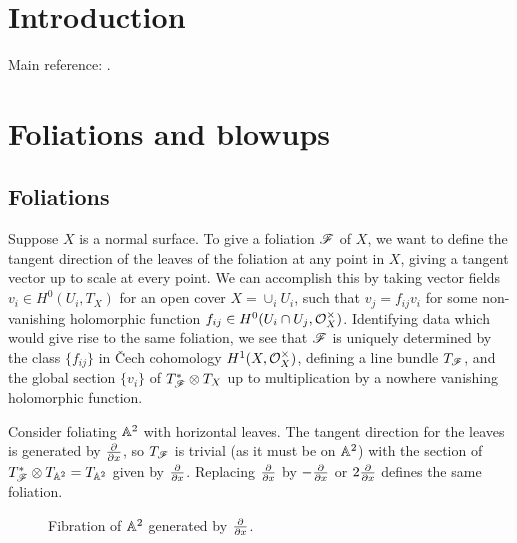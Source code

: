 
\section{Introduction}


Main reference: \cite{brunella_book}.

\section{Foliations and blowups}

\subsection{Foliations}

Suppose $X$ is a normal surface. To give a foliation $\mathscr{F}$ of $X$, we want to
define the tangent direction of the leaves of the foliation at any point in $X$,
giving a tangent vector up to scale at every point. We can accomplish this by
taking vector fields $v_i\in H^0(U_i,T_X)$ for an open cover $X=\cup_iU_i$, such
that $v_j=f_{ij}v_i$ for some non-vanishing holomorphic function
$f_{ij}\in H^0(U_i\cap U_j,\mathcal{O}_X^\times)$. Identifying data which would give rise
to the same foliation, we see that $\mathscr{F}$ is uniquely determined by the class
$\{f_{ij}\}$ in \v{C}ech cohomology $H^1(X,\mathcal{O}_X^\times)$, defining a line bundle
$T_{\mathscr{F}}$, and the global section $\{v_i\}$ of $T_{\mathscr{F}}^*\otimes T_X$ up to
multiplication by a nowhere vanishing holomorphic function.

\begin{example}
    Consider foliating $\mathbb{A}^2$ with horizontal leaves. The tangent direction for
    the leaves is generated by $\pdv{}{x}$, so $T_{\mathscr{F}}$ is trivial (as it must
    be on $\mathbb{A}^2$) with the section of $T_{\mathscr{F}}^*\otimes T_{\mathbb{A}^2}=T_{\mathbb{A}^2}$ given
    by $\pdv{}{x}$. Replacing $\pdv{}{x}$ by $-\pdv{}{x}$ or $2\pdv{}{x}$
    defines the same foliation.
    \begin{figure}[H]
        \centering
        \caption{Fibration of $\mathbb{A}^2$ generated by $\pdv{}{x}$.}
    \end{figure}
\end{example}

